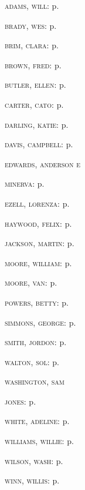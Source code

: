\begin{multicols}{2}[]
{\small{
\textsc{adams, will:} p.~\pageref{img14}

\textsc{brady, wes:} p.~\pageref{img15}

\textsc{brim, clara:} p.~\pageref{img4}

\textsc{brown, fred:} p.~\pageref{img12}

\textsc{butler, ellen:} p.~\pageref{img18}

\textsc{carter, cato:} p.~\pageref{img10}

\textsc{darling, katie:} p.~\pageref{img1}

\textsc{davis, campbell:} p.~\pageref{img6}

\textsc{edwards, anderson e} 

\textsc{minerva:} p.~\pageref{img16}

\textsc{ezell, lorenza:} p.~\pageref{img7}

\textsc{haywood, felix:} p.~\pageref{img21}

\textsc{jackson, martin:} p.~\pageref{img13}

\textsc{moore, william:} p.~\pageref{img19}

\textsc{moore, van:} p.~\pageref{img22}

\textsc{powers, betty:} p.~\pageref{img11}

\textsc{simmons, george:} p.~\pageref{img5}

\textsc{smith, jordon:} p.~\pageref{img2}

\textsc{walton, sol:} p.~\pageref{img3}

\textsc{washington, sam}

\textsc{jones:} p.~\pageref{img8}

\textsc{white, adeline:} p.~\pageref{img23}

\textsc{williams, willie:} p.~\pageref{img20}

\textsc{wilson, wash:} p.~\pageref{img17}

\textsc{winn, willis:} p.~\pageref{img9}
}}
\end{multicols}
